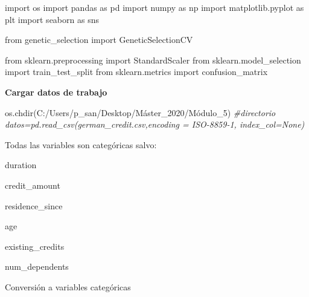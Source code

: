 \documentclass[
  a4paper,
  DIV=11,
  numbers=noendperiod]{scrreprt}
\newenvironment{Shaded}{\begin{snugshade}}{\end{snugshade}}
\newcommand{\CommentTok}[1]{\textcolor[rgb]{0.56,0.35,0.01}{\textit{#1}}}
\newcommand{\ImportTok}[1]{#1}
\newcommand{\NormalTok}[1]{#1}
\newcommand{\StringTok}[1]{\textcolor[rgb]{0.31,0.60,0.02}{#1}}
\begin{document}
\begin{Shaded}
\begin{Highlighting}[numbers=left,,]
\ImportTok{import}\NormalTok{ os }\ImportTok{import}\NormalTok{ pandas }\ImportTok{as}\NormalTok{ pd }\ImportTok{import}\NormalTok{ numpy }\ImportTok{as}\NormalTok{ np }\ImportTok{import}\NormalTok{ matplotlib.pyplot }\ImportTok{as}\NormalTok{ plt }\ImportTok{import}\NormalTok{ seaborn }\ImportTok{as}\NormalTok{ sns}

\ImportTok{from}\NormalTok{ genetic\_selection }\ImportTok{import}\NormalTok{ GeneticSelectionCV}

\ImportTok{from}\NormalTok{ sklearn.preprocessing }\ImportTok{import}\NormalTok{ StandardScaler }\ImportTok{from}\NormalTok{ sklearn.model\_selection }\ImportTok{import}\NormalTok{ train\_test\_split }\ImportTok{from}\NormalTok{ sklearn.metrics }\ImportTok{import}\NormalTok{ confusion\_matrix}
\end{Highlighting}
\end{Shaded}

\textbf{Cargar datos de trabajo}

\begin{Shaded}
\begin{Highlighting}[numbers=left,,]

\NormalTok{os.chdir(}\StringTok{\textquotesingle{}C:/Users/p\_san/Desktop/Máster\_2020/Módulo\_5\textquotesingle{}}\NormalTok{) }\CommentTok{\#directorio datos=pd.read\_csv(\textquotesingle{}german\_credit.csv\textquotesingle{},encoding = \textquotesingle{}ISO{-}8859{-}1\textquotesingle{}, index\_col=None)}
\end{Highlighting}
\end{Shaded}

Todas las variables son categóricas salvo:

duration

credit\_amount

residence\_since

age

existing\_credits

num\_dependents

Conversión a variables categóricas
\end{document}
